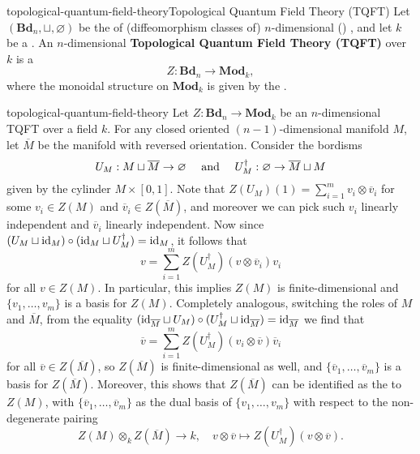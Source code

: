 \begin{topic}{topological-quantum-field-theory}{Topological Quantum Field Theory (TQFT)}
    Let $(\textbf{Bd}_n, \sqcup, \varnothing)$ be the  of (diffeomorphism classes of) $n$-dimensional () , and let $k$ be a . An $n$-dimensional \textbf{Topological Quantum Field Theory (TQFT)} over $k$ is a 
    \[ Z : \textbf{Bd}_n \to \textbf{Mod}_k , \]
    where the monoidal structure on $\textbf{Mod}_k$ is given by the .
\end{topic}


\begin{example}{topological-quantum-field-theory}
    Let $Z : \textbf{Bd}_n \to \textbf{Mod}_k$ be an $n$-dimensional TQFT over a field $k$. For any closed oriented $(n - 1)$-dimensional manifold $M$, let $\overline{M}$ be the manifold with reversed orientation. Consider the bordisms
    \[ U_M : M \sqcup \overline{M} \to \varnothing \quad \textup{ and } \quad U_M^\dag : \varnothing \to \overline{M} \sqcup M \]
    given by the cylinder $M \times [0, 1]$.
    Note that $Z(U_M)(1) = \sum_{i = 1}^{m} v_i \otimes \overline{v}_i$ for some $v_i \in Z(M)$ and $\overline{v}_i \in Z(\overline{M})$, and moreover we can pick such $v_i$ linearly independent and $\overline{v}_i$ linearly independent.
    Now since $(U_M \sqcup \textup{id}_M) \circ (\textup{id}_M \sqcup U_M^\dag) = \textup{id}_M$, it follows that
    \[ v = \sum_{i = 1}^{m} Z(U_M^\dag)(v \otimes \overline{v}_i) v_i \]
    for all $v \in Z(M)$. In particular, this implies $Z(M)$ is finite-dimensional and $\{ v_1, \ldots, v_m \}$ is a basis for $Z(M)$.
    Completely analogous, switching the roles of $M$ and $\overline{M}$, from the equality $(\textup{id}_{\overline{M}} \sqcup U_M) \circ (U_M^\dag \sqcup \textup{id}_{\overline{M}}) = \textup{id}_{\overline{M}}$ we find that
    \[ \overline{v} = \sum_{i = 1}^{m} Z(U_M^\dag)(v_i \otimes \overline{v}) \overline{v}_i \]
    for all $\overline{v} \in Z(\overline{M})$, so $Z(\overline{M})$ is finite-dimensional as well, and $\{ \overline{v}_1, \ldots, \overline{v}_m \}$ is a basis for $Z(\overline{M})$. Moreover, this shows that $Z(\overline{M})$ can be identified as the  to $Z(M)$, with $\{ \overline{v}_1, \ldots, \overline{v}_m \}$ as the dual basis of $\{ v_1, \ldots, v_m \}$ with respect to the non-degenerate pairing
    \[ Z(M) \otimes_k Z(\overline{M}) \to k, \quad v \otimes \overline{v} \mapsto Z(U_M^\dagger)(v \otimes \overline{v}) . \]
\end{example}
